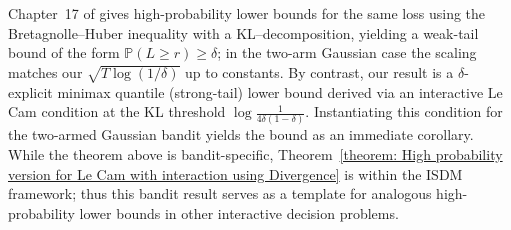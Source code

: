 \documentclass[conference]{IEEEtran}
\begin{document}
Chapter~17 of \cite{lattimore2020bandit} gives high-probability lower bounds for the same loss using the Bretagnolle–Huber inequality with a KL–decomposition, yielding a weak-tail bound of the form $\mathbb{P}(L\ge r)\ge \delta$; in the two-arm Gaussian case the scaling matches our $\sqrt{T\log(1/\delta)}$ up to constants. By contrast, our result is a $\delta$-explicit minimax quantile (strong-tail) lower bound derived via an interactive Le Cam condition at the KL threshold $\log\!\tfrac{1}{4\delta(1-\delta)}$. Instantiating this condition for the two-armed Gaussian bandit yields the bound as an immediate corollary.
 While the theorem above is bandit-specific, Theorem~\ref{theorem: High probability version for Le Cam with interaction using Divergence} is within the ISDM framework; thus this bandit result serves as a template for analogous high-probability lower bounds in other interactive decision problems.
\fi
\end{document}
